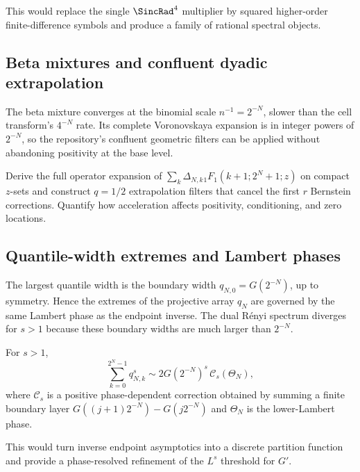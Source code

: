 \documentclass[11pt]{article}
\theoremstyle{definition}
\theoremstyle{remark}
\begin{document}
This would replace the single $\SincRad^4$ multiplier by squared higher-order
finite-difference symbols and produce a family of rational spectral objects.

\subsection{Beta mixtures and confluent dyadic extrapolation}

The beta mixture converges at the binomial scale $n^{-1}=2^{-N}$, slower than
the cell transform's $4^{-N}$ rate.  Its complete Voronovskaya expansion is in
integer powers of $2^{-N}$, so the repository's confluent geometric filters can
be applied without abandoning positivity at the base level.

\begin{openproblem}
\label{p3:op:beta-acceleration}
Derive the full operator expansion of
$\sum_k\Delta_{N,k}{}_1F_1(k+1;2^N+1;z)$ on compact $z$-sets and construct
$q=1/2$ extrapolation filters that cancel the first $r$ Bernstein corrections.
Quantify how acceleration affects positivity, conditioning, and zero locations.
\end{openproblem}

\subsection{Quantile-width extremes and Lambert phases}

The largest quantile width is the boundary width
$q_{N,0}=G(2^{-N})$, up to symmetry.  Hence the extremes of the projective array
$q_N$ are governed by the same Lambert phase as the endpoint inverse.
The dual R\'enyi spectrum diverges for $s>1$ because these boundary widths are
much larger than $2^{-N}$.

\begin{conjecture}
\label{p3:conj:q-width-partition}
For $s>1$,
\begin{equation}\label{p3:eq:q-width-conj}
 \sum_{k=0}^{2^N-1}q_{N,k}^s
 \sim2G(2^{-N})^s\,\mathcal C_s(\Theta_N),
\end{equation}
where $\mathcal C_s$ is a positive phase-dependent correction obtained by
summing a finite boundary layer
$G((j+1)2^{-N})-G(j2^{-N})$ and $\Theta_N$ is the lower-Lambert phase.
\end{conjecture}

This would turn inverse endpoint asymptotics into a discrete partition function
and provide a phase-resolved refinement of the $L^s$ threshold for $G'$.
\end{document}
